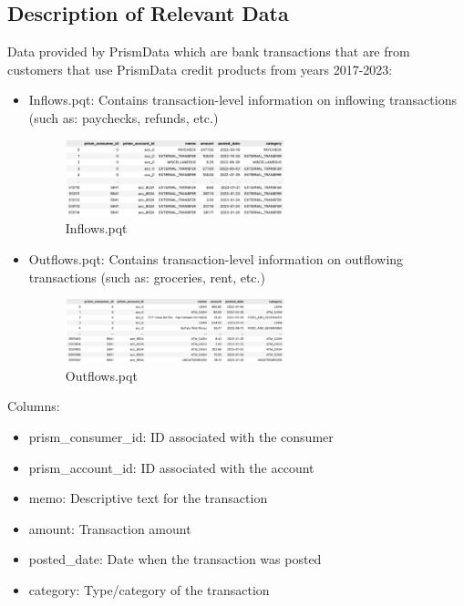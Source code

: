 \documentclass[12pt,letterpaper]{article}
\begin{document}
\subsection{Description of Relevant Data}
{Data provided by PrismData which are bank transactions that are from customers that use PrismData credit products from years 2017-2023:}
\begin{itemize}
    \item {Inflows.pqt: Contains transaction-level information on inflowing transactions (such as: paychecks, refunds, etc.)}
    \begin{figure}[H]
        \centering
        \includegraphics[width=0.6\textwidth]{pngs/inflows.png}
        \caption{Inflows.pqt}
        \label{fig:enter-label}
    \end{figure}
    
    \item {Outflows.pqt: Contains transaction-level information on outflowing transactions (such as: groceries, rent, etc.)}
    \begin{figure}[H]
        \centering
        \includegraphics[width=0.6\textwidth]{pngs/outflows.png}
        \caption{Outflows.pqt}
        \label{fig:enter-label}
    \end{figure}
    
\end{itemize}
Columns:
\begin{itemize}
    \item {prism\_consumer\_id: ID associated with the consumer}
    \item {prism\_account\_id: ID associated with the account}
    \item {memo: Descriptive text for the transaction}
    \item {amount: Transaction amount}
    \item {posted\_date: Date when the transaction was posted}
    \item {category: Type/category of the transaction}
\end{itemize}
\end{document}
